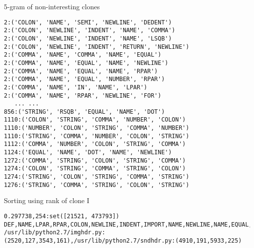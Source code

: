 \begin{frame}[fragile]{5-gram of non-interesting clones}
\begin{lstlisting}
2:('COLON', 'NAME', 'SEMI', 'NEWLINE', 'DEDENT')
2:('COLON', 'NEWLINE', 'INDENT', 'NAME', 'COMMA')
2:('COLON', 'NEWLINE', 'INDENT', 'NAME', 'LSQB')
2:('COLON', 'NEWLINE', 'INDENT', 'RETURN', 'NEWLINE')
2:('COMMA', 'NAME', 'COMMA', 'NAME', 'EQUAL')
2:('COMMA', 'NAME', 'EQUAL', 'NAME', 'NEWLINE')
2:('COMMA', 'NAME', 'EQUAL', 'NAME', 'RPAR')
2:('COMMA', 'NAME', 'EQUAL', 'NUMBER', 'RPAR')
2:('COMMA', 'NAME', 'IN', 'NAME', 'LPAR')
2:('COMMA', 'NAME', 'RPAR', 'NEWLINE', 'FOR')
   ... ...
856:('STRING', 'RSQB', 'EQUAL', 'NAME', 'DOT')
1110:('COLON', 'STRING', 'COMMA', 'NUMBER', 'COLON')
1110:('NUMBER', 'COLON', 'STRING', 'COMMA', 'NUMBER')
1110:('STRING', 'COMMA', 'NUMBER', 'COLON', 'STRING')
1112:('COMMA', 'NUMBER', 'COLON', 'STRING', 'COMMA')
1124:('EQUAL', 'NAME', 'DOT', 'NAME', 'NEWLINE')
1272:('COMMA', 'STRING', 'COLON', 'STRING', 'COMMA')
1274:('COLON', 'STRING', 'COMMA', 'STRING', 'COLON')
1274:('STRING', 'COLON', 'STRING', 'COMMA', 'STRING')
1276:('STRING', 'COMMA', 'STRING', 'COLON', 'STRING')
\end{lstlisting}
\end{frame}

\begin{frame}[shrink=25,fragile]{Sorting using rank of clone I}
\lstset{
    breaklines=true
}
\begin{lstlisting}
0.297738,254:set([21521, 473793])	DEF,NAME,LPAR,RPAR,COLON,NEWLINE,INDENT,IMPORT,NAME,NEWLINE,NAME,EQUAL,NUMBER,NEWLINE,IF,NAME,DOT,NAME,LSQB,NUMBER,COLON,RSQB,AND,NAME,DOT,NAME,LSQB,NUMBER,RSQB,EQEQUAL,STRING,COLON,NEWLINE,INDENT,DEL,NAME,DOT,NAME,LSQB,NUMBER,COLON,NUMBER,RSQB,NEWLINE,NAME,EQUAL,NUMBER,NEWLINE,DEDENT,TRY,COLON,NEWLINE,INDENT,IF,NAME,DOT,NAME,LSQB,NUMBER,COLON,RSQB,COLON,NEWLINE,INDENT,NAME,LPAR,NAME,DOT,NAME,LSQB,NUMBER,COLON,RSQB,COMMA,NAME,COMMA,NUMBER,RPAR,NEWLINE,DEDENT,ELSE,COLON,NEWLINE,INDENT,NAME,LPAR,LSQB,STRING,RSQB,COMMA,NAME,COMMA,NUMBER,RPAR,NEWLINE,DEDENT,DEDENT,EXCEPT,NAME,COLON,NEWLINE,INDENT,NAME,DOT,NAME,DOT,NAME,LPAR,STRING,RPAR,NEWLINE,NAME,DOT,NAME,LPAR,NUMBER,RPAR,NEWLINE,DEDENT,DEDENT,DEF,NAME,LPAR,NAME,COMMA,NAME,COMMA,NAME,RPAR,COLON,NEWLINE,INDENT,IMPORT,NAME,NEWLINE,IMPORT,NAME,NEWLINE,FOR,NAME,IN,NAME,COLON,NEWLINE,INDENT,IF,NAME,DOT,NAME,DOT,NAME,LPAR,NAME,RPAR,COLON,NEWLINE,INDENT,PRINT,NAME,PLUS,STRING,COMMA,NEWLINE,IF,NAME,OR,NAME,COLON,NEWLINE,INDENT,PRINT,STRING,NEWLINE,IMPORT,NAME,NEWLINE,NAME,EQUAL,NAME,DOT,NAME,LPAR,NAME,DOT,NAME,DOT,NAME,LPAR,NAME,COMMA,STRING,RPAR,RPAR,NEWLINE,NAME,LPAR,NAME,COMMA,NAME,COMMA,NUMBER,RPAR,NEWLINE,DEDENT,ELSE,COLON,NEWLINE,INDENT,PRINT,STRING,NEWLINE,DEDENT,DEDENT,ELSE,COLON,NEWLINE,INDENT,PRINT,NAME,PLUS,STRING,COMMA,NEWLINE,NAME,DOT,NAME,DOT,NAME,LPAR,RPAR,NEWLINE,TRY,COLON,NEWLINE,INDENT,PRINT,NAME,LPAR,NAME,RPAR,NEWLINE,DEDENT,EXCEPT,NAME,COLON,NEWLINE,INDENT,PRINT,STRING,NEWLINE,DEDENT,DEDENT,DEDENT,DEDENT	/usr/lib/python2.7/imghdr.py:(2520,127,3543,161),/usr/lib/python2.7/sndhdr.py:(4910,191,5933,225)
\end{lstlisting}

\end{frame}

